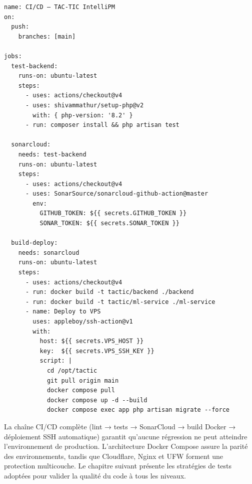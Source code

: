 \begin{lstlisting}[style=yamlstyle,caption={Pipeline GitHub Actions — .github/workflows/deploy.yml},
  label={lst:github_actions}]
name: CI/CD — TAC-TIC IntelliPM
on:
  push:
    branches: [main]

jobs:
  test-backend:
    runs-on: ubuntu-latest
    steps:
      - uses: actions/checkout@v4
      - uses: shivammathur/setup-php@v2
        with: { php-version: '8.2' }
      - run: composer install && php artisan test

  sonarcloud:
    needs: test-backend
    runs-on: ubuntu-latest
    steps:
      - uses: actions/checkout@v4
      - uses: SonarSource/sonarcloud-github-action@master
        env:
          GITHUB_TOKEN: ${{ secrets.GITHUB_TOKEN }}
          SONAR_TOKEN: ${{ secrets.SONAR_TOKEN }}

  build-deploy:
    needs: sonarcloud
    runs-on: ubuntu-latest
    steps:
      - uses: actions/checkout@v4
      - run: docker build -t tactic/backend ./backend
      - run: docker build -t tactic/ml-service ./ml-service
      - name: Deploy to VPS
        uses: appleboy/ssh-action@v1
        with:
          host: ${{ secrets.VPS_HOST }}
          key:  ${{ secrets.VPS_SSH_KEY }}
          script: |
            cd /opt/tactic
            git pull origin main
            docker compose pull
            docker compose up -d --build
            docker compose exec app php artisan migrate --force
\end{lstlisting}

\begin{chapconclusion}
La chaîne CI/CD complète (lint → tests → SonarCloud → build Docker → déploiement
SSH automatique) garantit qu'aucune régression ne peut atteindre l'environnement
de production. L'architecture Docker Compose assure la parité des environnements,
tandis que Cloudflare, Nginx et UFW forment une protection multicouche. Le chapitre
suivant présente les stratégies de tests adoptées pour valider la qualité du code
à tous les niveaux.
\end{chapconclusion}
